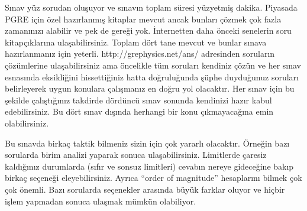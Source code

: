 \documentclass[12pt]{article}
\theoremstyle{break}
\begin{document}
Sınav yüz sorudan oluşuyor ve sınavın toplam süresi yüzyetmiş dakika. Piyasada PGRE için özel hazırlanmış kitaplar mevcut ancak bunları çözmek çok fazla zamanınızı alabilir ve pek de gereği yok. İnternetten daha önceki senelerin soru kitapçıklarına ulaşabilirsiniz. Toplam dört tane mevcut ve bunlar sınava hazırlanmanız için yeterli. http://grephysics.net/ans/ adresinden soruların çözümlerine ulaşabilirsiniz ama öncelikle tüm soruları kendiniz çözün ve her sınav esnasında eksikliğini hissettiğiniz hatta doğruluğunda şüphe duyduğunuz soruları belirleyerek uygun konulara çalışmanız en doğru yol olacaktır. Her sınav için bu şekilde çalıştığınız takdirde dördüncü sınav sonunda kendinizi hazır kabul edebilirsiniz. Bu dört sınav dışında herhangi bir konu çıkmayacağına emin olabilirsiniz. 

Bu sınavda birkaç taktik bilmeniz sizin için çok yararlı olacaktır. Örneğin bazı sorularda birim analizi yaparak sonuca ulaşabilirsiniz. Limitlerde çaresiz kaldığınız durumlarda (sıfır ve sonsuz limitleri) cevabın nereye gideceğine bakıp birkaç seçeneği eleyebilirsiniz. Ayrıca “order of magnitude” hesaplarını bilmek çok çok önemli. Bazı sorularda seçenekler arasında büyük farklar oluyor ve hiçbir işlem yapmadan sonuca ulaşmak mümkün olabiliyor. 
\end{document}
